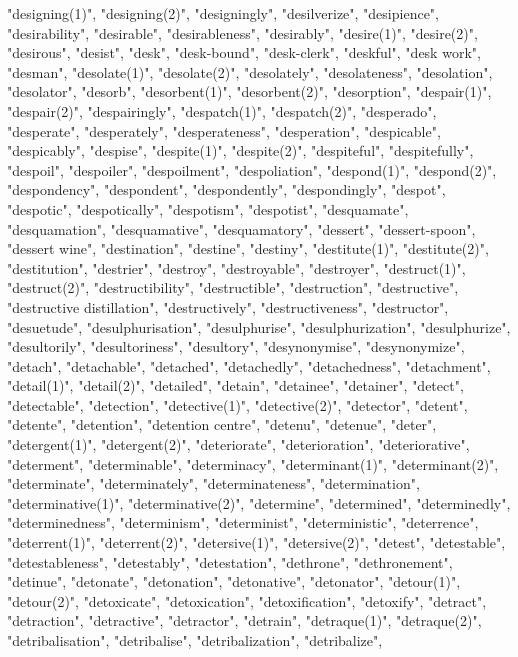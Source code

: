 "designing(1)",
"designing(2)",
"designingly",
"desilverize",
"desipience",
"desirability",
"desirable",
"desirableness",
"desirably",
"desire(1)",
"desire(2)",
"desirous",
"desist",
"desk",
"desk-bound",
"desk-clerk",
"deskful",
"desk work",
"desman",
"desolate(1)",
"desolate(2)",
"desolately",
"desolateness",
"desolation",
"desolator",
"desorb",
"desorbent(1)",
"desorbent(2)",
"desorption",
"despair(1)",
"despair(2)",
"despairingly",
"despatch(1)",
"despatch(2)",
"desperado",
"desperate",
"desperately",
"desperateness",
"desperation",
"despicable",
"despicably",
"despise",
"despite(1)",
"despite(2)",
"despiteful",
"despitefully",
"despoil",
"despoiler",
"despoilment",
"despoliation",
"despond(1)",
"despond(2)",
"despondency",
"despondent",
"despondently",
"despondingly",
"despot",
"despotic",
"despotically",
"despotism",
"despotist",
"desquamate",
"desquamation",
"desquamative",
"desquamatory",
"dessert",
"dessert-spoon",
"dessert wine",
"destination",
"destine",
"destiny",
"destitute(1)",
"destitute(2)",
"destitution",
"destrier",
"destroy",
"destroyable",
"destroyer",
"destruct(1)",
"destruct(2)",
"destructibility",
"destructible",
"destruction",
"destructive",
"destructive distillation",
"destructively",
"destructiveness",
"destructor",
"desuetude",
"desulphurisation",
"desulphurise",
"desulphurization",
"desulphurize",
"desultorily",
"desultoriness",
"desultory",
"desynonymise",
"desynonymize",
"detach",
"detachable",
"detached",
"detachedly",
"detachedness",
"detachment",
"detail(1)",
"detail(2)",
"detailed",
"detain",
"detainee",
"detainer",
"detect",
"detectable",
"detection",
"detective(1)",
"detective(2)",
"detector",
"detent",
"detente",
"detention",
"detention centre",
"detenu",
"detenue",
"deter",
"detergent(1)",
"detergent(2)",
"deteriorate",
"deterioration",
"deteriorative",
"determent",
"determinable",
"determinacy",
"determinant(1)",
"determinant(2)",
"determinate",
"determinately",
"determinateness",
"determination",
"determinative(1)",
"determinative(2)",
"determine",
"determined",
"determinedly",
"determinedness",
"determinism",
"determinist",
"deterministic",
"deterrence",
"deterrent(1)",
"deterrent(2)",
"detersive(1)",
"detersive(2)",
"detest",
"detestable",
"detestableness",
"detestably",
"detestation",
"dethrone",
"dethronement",
"detinue",
"detonate",
"detonation",
"detonative",
"detonator",
"detour(1)",
"detour(2)",
"detoxicate",
"detoxication",
"detoxification",
"detoxify",
"detract",
"detraction",
"detractive",
"detractor",
"detrain",
"detraque(1)",
"detraque(2)",
"detribalisation",
"detribalise",
"detribalization",
"detribalize",
